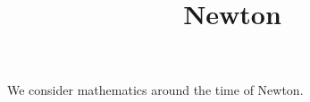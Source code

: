 \documentclass{ximera}
\title{Newton}
\begin{document}
\begin{abstract}
\end{abstract}
\maketitle

We consider mathematics around the time of Newton.
\end{document}
